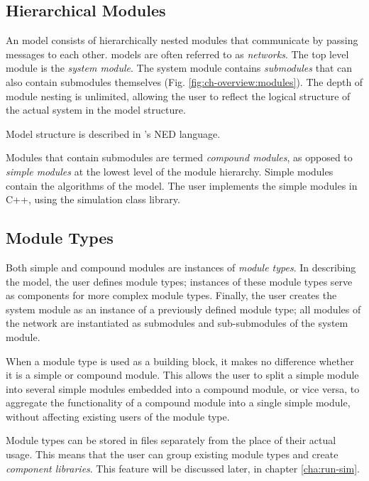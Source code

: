 \subsection{Hierarchical Modules}


An {\opp} model consists of hierarchically nested
modules that communicate by passing
messages to each other.
{\opp} models are often referred to as \textit{networks}. The top
level module is the \textit{system module}.  The system module
contains \textit{submodules} that can also contain submodules
themselves (Fig. \ref{fig:ch-overview:modules}). The depth of module
nesting is unlimited, allowing the user to reflect the logical
structure of the actual system in the model structure.

Model structure is described in {\opp}'s NED language.

Modules that contain submodules are termed \textit{compound
  modules}, as opposed to \textit{simple
  modules} at the lowest level of the
module hierarchy. Simple modules contain the algorithms of the model.
The user implements the simple modules in C++, using the {\opp}
simulation class library.


\subsection{Module Types}

Both simple and compound modules are instances of \textit{module
  types}. In describing the model, the user defines module types;
instances of these module types serve as components for more complex
module types. Finally, the user creates the system module as an
instance of a previously defined module type; all modules of the
network are instantiated as submodules and sub-submodules of the
system module.

When a module type is used as a building block, it makes no difference
whether it is a simple or compound module. This allows
the user to split a simple module into several
simple modules embedded into a compound module,
or vice versa, to aggregate the functionality of a compound module into a
single simple module, without affecting existing users of the module
type.

Module types can be stored in files separately from the place
of their actual usage. This means that the user can group existing
module types and create \textit{component libraries}. This feature
will be discussed later, in chapter \ref{cha:run-sim}.



